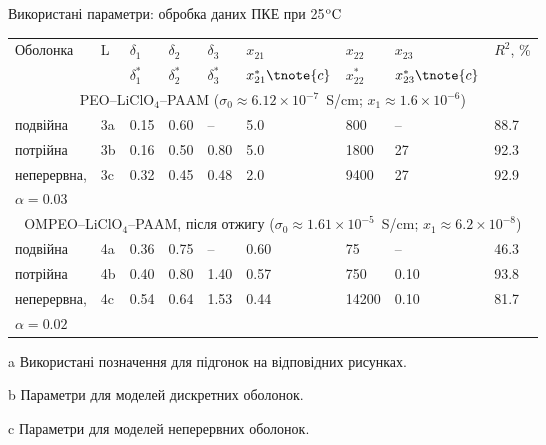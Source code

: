 \documentclass[10pt]{beamer}
\begin{document}
\begin{frame}{Використані параметри: обробка даних ПКЕ при 25$\rm ^{o}C$}
\footnotesize

\begin{table}[tb]
	\centering 
	\begin{threeparttable}
		\begin{tabular}{|l|l|l|l|l|l|l|l|l|}
			\hline
			\multirow{2}{*}{Оболонка} &\multirow{2}{*}{L\tnote{a}} & $\delta_1$\tnote{b} & $\delta_2$\tnote{b} & $\delta_3$\tnote{b} & $x_{21}$\tnote{b} & $x_{22}$\tnote{b} & $x_{23}$\tnote{b} & \multirow{2}{*}{$R^2$, \%} \\
			&  & $\delta^\ast_1$\tnote{c}& $\delta^\ast_2$\tnote{c}&$\delta^\ast_3$\tnote{c}&$x^\ast_{21}\tnote{c}$&$x^\ast_{22}$\tnote{c}&$x^\ast_{23} \tnote{c}$ & \\
			\hline
			\multicolumn{9}{c}{PEO--LiClO$_4$--PAAM ($\sigma_0 \approx 6.12\times 10^{-7}$~S/cm; $x_1 \approx 1.6 \times 10^{-6}$)}\\
			\hline
			подвійна &3a & 0.15&0.60& -- & 5.0           &800 &--& 88.7 \\
			потрійна  &3b              &0.16&0.50&0.80 & 5.0 &1800 &27 &  92.3 \\
			неперервна,  &3c                      &  0.32&0.45&0.48 & 2.0     &9400&27 & 92.9 \\
			$\alpha =0.03$ &   & & & & &  & & \\
			\hline
			\multicolumn{9}{c}{OMPEO--LiClO$_4$--PAAM, після отжигу ($\sigma_0 \approx 1.61\times 10^{-5}$~S/cm; $x_1 \approx 6.2\times 10^{-8}$)}\\
			\hline
			подвійна   &4a   &0.36&0.75& -- &0.60& 75 &--& 46.3\\
			потрійна   & 4b             &0.40&0.80&1.40&0.57& 750&0.10 &  93.8\\
			неперервна, &4c       &0.54&0.64&1.53&0.44&14200&0.10 &  81.7\\
			$\alpha =0.02$ &  &  & & & &  & & \\
			\hline
		\end{tabular}
		\begin{tablenotes}
			\item[a] Використані позначення для підгонок на відповідних
			рисунках.
			\item[b] Параметри для моделей дискретних оболонок.
			\item[c] Параметри для моделей неперервних оболонок.
		\end{tablenotes}
	\end{threeparttable}
\end{table}

\end{frame}
\end{document}
